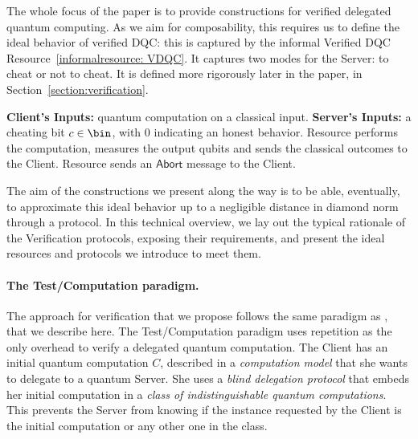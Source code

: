 The whole focus of the paper is to provide constructions for verified delegated quantum computing. As we aim for composability, this requires us to define the ideal behavior of verified DQC: this is captured by the informal Verified DQC Resource~\ref{informalresource: VDQC}. It captures two modes for the Server: to cheat or not to cheat. It is defined more rigorously later in the paper, in Section~\ref{section:verification}.
\begin{informalresource}
    \caption{Verified Delegated Quantum Computation}
    \label{informalresource: VDQC}
    \begin{algorithmic}[0]
        \State \textbf{Client's Inputs:} quantum computation on a classical input.
        \State \textbf{Server's Inputs:} a cheating bit $c\in\bin$, with $0$ indicating an honest behavior.
            \State Resource performs the computation, measures the output qubits and sends the classical outcomes to the Client.
            \Else
            \State Resource sends an $\mathsf{Abort}$ message to the Client.
            \EndIf
        \EndProcedure
    \end{algorithmic}
\end{informalresource}
The aim of the constructions we present along the way is to be able, eventually, to approximate this ideal behavior up to a negligible distance in diamond norm through a protocol. In this technical overview, we lay out the typical rationale of the Verification protocols, exposing their requirements, and present the ideal resources and protocols we introduce to meet them.

\paragraph{The Test/Computation paradigm.}
The approach for verification that we propose follows the same paradigm as \cite{B18how,LMKO21verifying}, that we describe here. The Test/Computation paradigm uses repetition as the only overhead to verify a delegated quantum computation. The Client has an initial quantum computation $C$, described in a \emph{computation model}  that she wants to delegate to a quantum Server. She uses a \emph{blind delegation protocol} that embeds her initial computation in a \emph{class of indistinguishable quantum computations}. This prevents the Server from knowing if the instance requested by the Client is the initial computation or any other one in the class.

